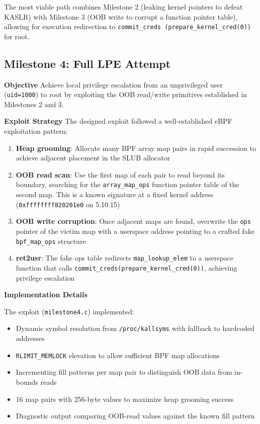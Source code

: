 The most viable path combines Milestone 2 (leaking kernel pointers to defeat KASLR) with Milestone 3 (OOB write to corrupt a function pointer table), allowing for execution redirection to \texttt{commit\_\allowbreak creds (prepare\_\allowbreak kernel\_\allowbreak cred(0))} for root.


\subsection{Milestone 4: Full LPE Attempt}

\textbf{Objective}
Achieve local privilege escalation from an unprivileged user (\texttt{uid=1000}) to root by exploiting the OOB read/write primitives established in Milestones 2 and 3.

\textbf{Exploit Strategy}
The designed exploit followed a well-established eBPF exploitation pattern:

\begin{enumerate}
    \item \textbf{Heap grooming}: Allocate many BPF array map pairs in rapid succession to achieve adjacent placement in the SLUB allocator
    \item \textbf{OOB read scan}: Use the first map of each pair to read beyond its boundary, searching for the \texttt{array\_map\_ops} function pointer table of the second map. This is a known signature at a fixed kernel address (\texttt{0xffffffff820201e0} on 5.10.15)
    \item \textbf{OOB write corruption}: Once adjacent maps are found, overwrite the \texttt{ops} pointer of the victim map with a userspace address pointing to a crafted fake \texttt{bpf\_map\_ops} structure
    \item \textbf{ret2usr}: The fake ops table redirects \texttt{map\_lookup\_elem} to a userspace function that calls \texttt{commit\_creds(prepare\_kernel\_cred(0))}, achieving privilege escalation
\end{enumerate}

\textbf{Implementation Details}

The exploit (\texttt{milestone4.c}) implemented:

\begin{itemize}
    \item Dynamic symbol resolution from \texttt{/proc/kallsyms} with fallback to hardcoded addresses
    \item \texttt{RLIMIT\_MEMLOCK} elevation to allow sufficient BPF map allocations
    \item Incrementing fill patterns per map pair to distinguish OOB data from in-bounds reads
    \item 16 map pairs with 256-byte values to maximize heap grooming success
    \item Diagnostic output comparing OOB-read values against the known fill pattern
\end{itemize}


